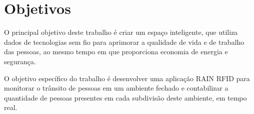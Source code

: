 \section{Objetivos}

O principal objetivo deste trabalho é criar um espaço inteligente, que utiliza dados de tecnologias sem fio para aprimorar a qualidade de vida e de trabalho das pessoas, ao mesmo tempo em que proporciona economia de energia e segurança.

O objetivo específico do trabalho é desenvolver uma aplicação RAIN RFID para monitorar o trânsito de pessoas em um ambiente fechado e contabilizar a quantidade de pessoas presentes em cada subdivisão deste ambiente, em tempo real.